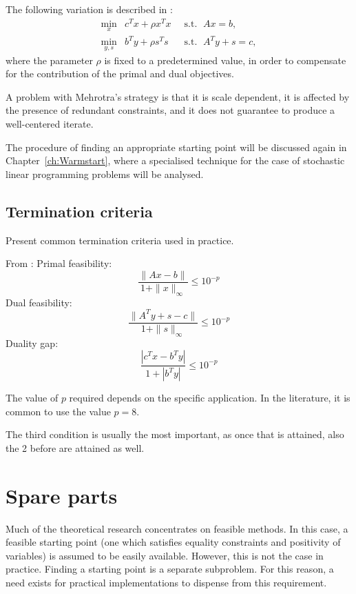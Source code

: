 The following variation is described in \cite{GondzioTerlaky}:
\begin{eqnarray*} 
  \min_x    \!\! & c^Tx + \rho x^Tx & \;\;\mbox{s.t. }\; Ax = b,      \\
  \min_{y,s}\!\! & b^Ty + \rho s^Ts & \;\;\mbox{s.t. }\; A^Ty + s = c,
\end{eqnarray*}
where the parameter $\rho$ is fixed to a predetermined value, in order
to compensate for the contribution of the primal and dual objectives.

A problem with Mehrotra's strategy is that it is scale dependent,
it is affected by the presence of redundant constraints,
and it does not guarantee to produce a well-centered iterate.

The procedure of finding an appropriate starting point will be discussed
again in Chapter~\ref{ch:Warmstart}, where a specialised technique for
the case of stochastic linear programming problems will be analysed.

%
%
\subsection{Termination criteria}

Present common termination criteria used in practice.

From \cite{GondzioTerlaky}:
Primal feasibility:
\[
\frac{\| Ax - b \|}{1 + \|x\|_\infty} \le10 ^{-p}
\]
Dual feasibility:
\[
\frac{\| A^Ty + s - c \|}{1 + \|s\|_\infty} \le10 ^{-p}
\]
Duality gap:
\[
\frac{| c^Tx - b^Ty |}{1 + | b^Ty |} \le10 ^{-p}
\]

The value of $p$ required depends on the specific application.
In the literature, it is common to use the value $p = 8$.

The third condition is usually the most important, as once that
is attained, also the 2 before are attained as well.


%
%
\section{Spare parts}

Much of the theoretical research concentrates on feasible 
methods. In this case, a feasible starting point (one which 
satisfies equality constraints and positivity of variables) 
is assumed to be easily available. However, this is not the 
case in practice. Finding a starting point is a separate 
subproblem. For this reason, a need exists for practical 
implementations to dispense from this requirement.

